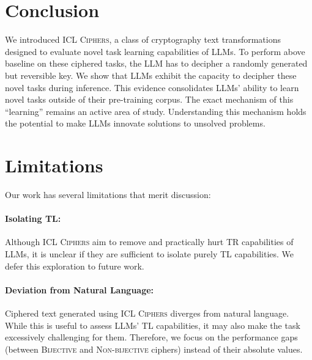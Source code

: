 \documentclass[11pt]{article}
\newcommand{\muhan}[1]{{\color{green}[{\bf Muhan}: #1]}}
\newcommand{\name}{\textsc{ICL Ciphers}}
\begin{document}
\section{Conclusion}
\label{sec:conclusion}

We introduced \name, a class of cryptography text transformations designed to evaluate novel task learning capabilities of LLMs. To perform above baseline on these ciphered tasks, the LLM has to decipher a randomly generated but reversible key. We show that LLMs exhibit the capacity to decipher these novel tasks during inference. This evidence consolidates LLMs' ability to learn novel tasks outside of their pre-training corpus. The exact mechanism of this ``learning'' remains an active area of study. Understanding this mechanism holds the potential to make LLMs innovate solutions to unsolved problems.


\section*{Limitations}
Our work has several limitations that merit discussion:

\paragraph{Isolating TL:} Although \name{} aim to remove and practically hurt TR capabilities of LLMs, it is unclear if they are sufficient to isolate purely TL capabilities. We defer this exploration to future work.

\paragraph{Deviation from Natural Language:}
Ciphered text generated using \name{} diverges from natural language. While this is useful to assess LLMs' TL capabilities, it may also make the task excessively challenging for them. Therefore, we focus on the performance gaps (between \textsc{Bijective} and \textsc{Non-bijective} ciphers) instead of their absolute values.

\end{document}
